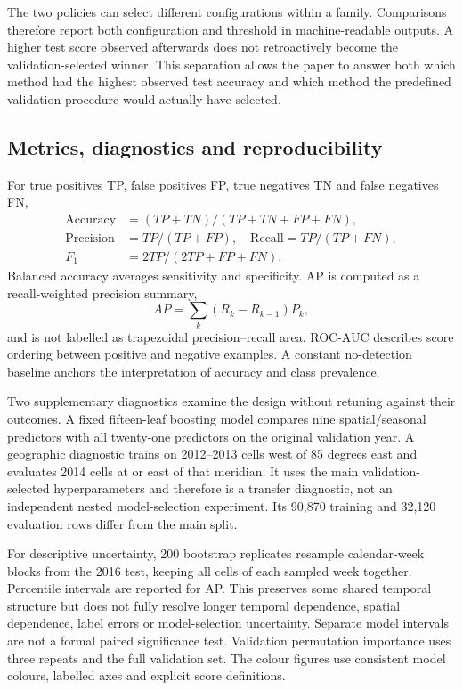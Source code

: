 \documentclass[conference,a4paper]{IEEEtran}
\begin{document}
The two policies can select different configurations within a family. Comparisons therefore report both configuration and threshold in machine-readable outputs. A higher test score observed afterwards does not retroactively become the validation-selected winner. This separation allows the paper to answer both which method had the highest observed test accuracy and which method the predefined validation procedure would actually have selected.

\subsection{Metrics, diagnostics and reproducibility}
For true positives TP, false positives FP, true negatives TN and false negatives FN,
\begin{align}
\mathrm{Accuracy}&=(TP+TN)/(TP+TN+FP+FN),\\
\mathrm{Precision}&=TP/(TP+FP),\quad
\mathrm{Recall}=TP/(TP+FN),\\
F_1&=2TP/(2TP+FP+FN).
\end{align}
Balanced accuracy averages sensitivity and specificity. AP is computed as a recall-weighted precision summary,
\begin{equation}
AP=\sum_k (R_k-R_{k-1})P_k,
\end{equation}
and is not labelled as trapezoidal precision--recall area. ROC-AUC describes score ordering between positive and negative examples. A constant no-detection baseline anchors the interpretation of accuracy and class prevalence.

Two supplementary diagnostics examine the design without retuning against their outcomes. A fixed fifteen-leaf boosting model compares nine spatial/seasonal predictors with all twenty-one predictors on the original validation year. A geographic diagnostic trains on 2012--2013 cells west of 85 degrees east and evaluates 2014 cells at or east of that meridian. It uses the main validation-selected hyperparameters and therefore is a transfer diagnostic, not an independent nested model-selection experiment. Its 90,870 training and 32,120 evaluation rows differ from the main split.

For descriptive uncertainty, 200 bootstrap replicates resample calendar-week blocks from the 2016 test, keeping all cells of each sampled week together. Percentile intervals are reported for AP. This preserves some shared temporal structure but does not fully resolve longer temporal dependence, spatial dependence, label errors or model-selection uncertainty. Separate model intervals are not a formal paired significance test. Validation permutation importance uses three repeats and the full validation set. The colour figures use consistent model colours, labelled axes and explicit score definitions.
\end{document}
